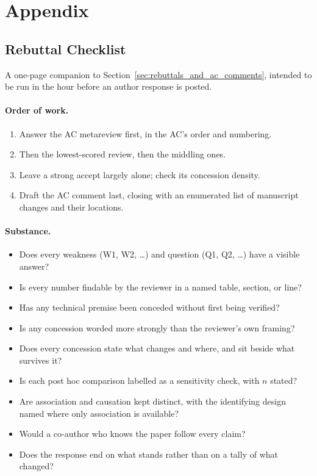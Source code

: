 
\section{Appendix}
\label{appendix:main}

\subsection{Rebuttal Checklist}
\label{appendix:rebuttal_checklist}

A one-page companion to Section~\ref{sec:rebuttals_and_ac_comments}, intended to be run in the hour before an author response is posted.

\paragraph{Order of work.}
\begin{enumerate}
    \item Answer the AC metareview first, in the AC's order and numbering.
    \item Then the lowest-scored review, then the middling ones.
    \item Leave a strong accept largely alone; check its concession density.
    \item Draft the AC comment last, closing with an enumerated list of manuscript changes and their locations.
\end{enumerate}

\paragraph{Substance.}
\begin{itemize}
    \item Does every weakness (W1, W2, \ldots) and question (Q1, Q2, \ldots) have a visible answer?
    \item Is every number findable by the reviewer in a named table, section, or line?
    \item Has any technical premise been conceded without first being verified?
    \item Is any concession worded more strongly than the reviewer's own framing?
    \item Does every concession state what changes and where, and sit beside what survives it?
    \item Is each post hoc comparison labelled as a sensitivity check, with $n$ stated?
    \item Are association and causation kept distinct, with the identifying design named where only association is available?
    \item Would a co-author who knows the paper follow every claim?
    \item Does the response end on what stands rather than on a tally of what changed?
\end{itemize}

